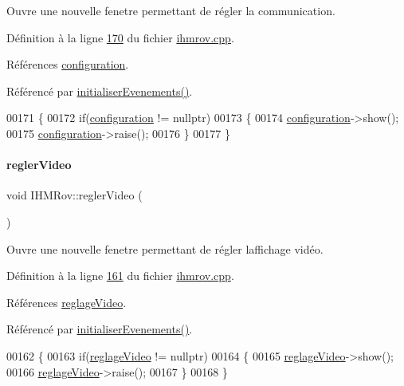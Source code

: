 Ouvre une nouvelle fenetre permettant de régler la communication. 



Définition à la ligne \hyperlink{ihmrov_8cpp_source_l00170}{170} du fichier \hyperlink{ihmrov_8cpp_source}{ihmrov.\+cpp}.



Références \hyperlink{ihmrov_8h_source_l00049}{configuration}.



Référencé par \hyperlink{ihmrov_8cpp_source_l00098}{initialiser\+Evenements()}.


\begin{DoxyCode}
00171 \{
00172     \textcolor{keywordflow}{if}(\hyperlink{class_i_h_m_rov_a29f4de081899d8830376f1ad27e74647}{configuration} != \textcolor{keyword}{nullptr})
00173     \{
00174         \hyperlink{class_i_h_m_rov_a29f4de081899d8830376f1ad27e74647}{configuration}->show();
00175         \hyperlink{class_i_h_m_rov_a29f4de081899d8830376f1ad27e74647}{configuration}->raise();
00176     \}
00177 \}
\end{DoxyCode}
\mbox{\label{class_i_h_m_rov_a68653dfe09dbb9695797d60e9190366b}} 
\paragraph{\texorpdfstring{regler\+Video}{reglerVideo}}
{\footnotesize\ttfamily void I\+H\+M\+Rov\+::regler\+Video (\begin{DoxyParamCaption}{ }\end{DoxyParamCaption})\hspace{0.3cm}{\ttfamily [slot]}}



Ouvre une nouvelle fenetre permettant de régler l\textquotesingle{}affichage vidéo. 



Définition à la ligne \hyperlink{ihmrov_8cpp_source_l00161}{161} du fichier \hyperlink{ihmrov_8cpp_source}{ihmrov.\+cpp}.



Références \hyperlink{ihmrov_8h_source_l00048}{reglage\+Video}.



Référencé par \hyperlink{ihmrov_8cpp_source_l00098}{initialiser\+Evenements()}.


\begin{DoxyCode}
00162 \{
00163     \textcolor{keywordflow}{if}(\hyperlink{class_i_h_m_rov_a6baa53853d29151404e6ae3dec5d2003}{reglageVideo} != \textcolor{keyword}{nullptr})
00164     \{
00165         \hyperlink{class_i_h_m_rov_a6baa53853d29151404e6ae3dec5d2003}{reglageVideo}->show();
00166         \hyperlink{class_i_h_m_rov_a6baa53853d29151404e6ae3dec5d2003}{reglageVideo}->raise();
00167     \}
00168 \}
\end{DoxyCode}
\mbox{\label{class_i_h_m_rov_a301a0b8cb323c2c9de71df9070bb7555}} 
